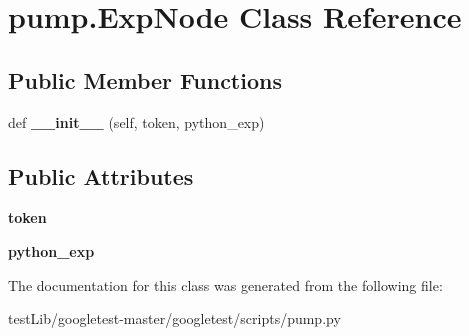 \hypertarget{classpump_1_1ExpNode}{}\section{pump.\+Exp\+Node Class Reference}
\label{classpump_1_1ExpNode}
\subsection*{Public Member Functions}
\begin{DoxyCompactItemize}
\item 
\mbox{\label{classpump_1_1ExpNode_a0808c394c4d3c8ac875005caa1b3e1b3}} 
def {\bfseries \+\_\+\+\_\+init\+\_\+\+\_\+} (self, token, python\+\_\+exp)
\end{DoxyCompactItemize}
\subsection*{Public Attributes}
\begin{DoxyCompactItemize}
\item 
\mbox{\label{classpump_1_1ExpNode_ade05a5a32535d717dc5c194569aaf356}} 
{\bfseries token}
\item 
\mbox{\label{classpump_1_1ExpNode_adccfe4778c2e34f6b2c88118c0f1587f}} 
{\bfseries python\+\_\+exp}
\end{DoxyCompactItemize}


The documentation for this class was generated from the following file\+:\begin{DoxyCompactItemize}
\item 
test\+Lib/googletest-\/master/googletest/scripts/pump.\+py\end{DoxyCompactItemize}
